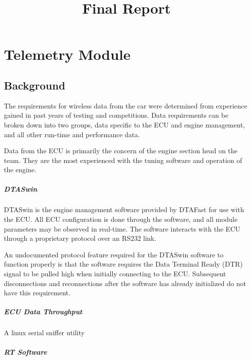 \documentclass[a4paper,10pt]{scrreprt}
\title{Final Report}
\author{}
\begin{document}
\maketitle

\begin{abstract}
\end{abstract}

\chapter{Telemetry Module}
\label{chap:telemetry}

\section{Background}

The requirements for wireless data from the car were determined from experience gained in past years of testing and competitions. Data requirements can be broken down into two groups, data specific to the ECU and engine management, and all other run-time and performance data.

Data from the ECU is primarily the concern of the engine section head on the team. They are the most experienced with the tuning software and operation of the engine.

\paragraph*{DTASwin} DTASwin is the engine management software provided by DTAFast for use with the ECU. All ECU configuration is done through the software, and all module parameters may be observed in real-time. The software interacts with the ECU through a proprietary protocol over an RS232 link.

An undocumented protocol feature required for the DTASwin software to function properly is that the software requires the Data Terminal Ready (DTR) signal to be pulled high when initially connecting to the ECU. Subsequent disconnections and reconnections after the software has already initialized do not have this requirement.

\paragraph*{ECU Data Throughput}
A linux serial sniffer utility

\paragraph*{RT Software}
\end{document}
